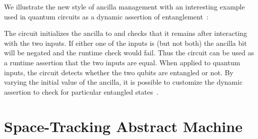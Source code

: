 \documentclass[sigplan,10pt,review,anonymous]{acmart}
\begin{document}
\PIFDUdef{}

\vspace{-\baselineskip}

\PIFDCombdef{}

\vspace{-\baselineskip}

\PIFDinterp{}

We illustrate the new style of ancilla management with an interesting
example used in quantum circuits as a dynamic assertion of
entanglement~\cite{DBLP:journals/cal/ZhouB19}:

\begin{figure}
  
\end{figure}  
\PIFDparity{}

\noindent The circuit initializes the ancilla to  and
checks that it remains  after interacting with the two
inputs. If either one of the inputs is  (but not both)
the ancilla bit will be negated and the runtime check would fail. Thus
the circuit can be used as a runtime assertion that the two inputs are
equal. When applied to quantum inputs, the circuit detects whether the
two qubits are entangled or not. By varying the initial value of the
ancilla, it is possible to customize the dynamic assertion to check
for particular entangled states~\cite{DBLP:journals/cal/ZhouB19}.

\section{Space-Tracking Abstract Machine}
\label{sec:space}  
\end{document}
